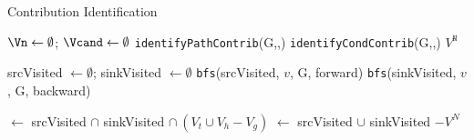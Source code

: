 \begin{algorithm}[t]\small
  \caption{Contribution Identification}
  \label{alg:main}
     {
    $\Vn \leftarrow \emptyset$; $\Vcand \leftarrow \emptyset$\;
    \texttt{identifyPathContrib}(G,\Vn,\Vcand)\;
    \texttt{identifyCondContrib}(G,\Vn,\Vcand)\;
    \Return $V^{\texttt{N}}$\;
  }

   {
    srcVisited $\leftarrow \emptyset $; sinkVisited $\leftarrow \emptyset $\;
     {
        \texttt{bfs}(srcVisited, $v$, G, forward)\;
    }
     {
        \texttt{bfs}(sinkVisited, $v$, G, backward)\;
    }

    \Vn $\leftarrow $ {srcVisited} $\cap$ {sinkVisited} $\cap\ (V_{t} \cup V_{h} - V_{g})$\;
    \Vcand $\leftarrow$ {srcVisited} $\cup$ {sinkVisited} $- V^{N}$\;
    
  }
\end{algorithm}





